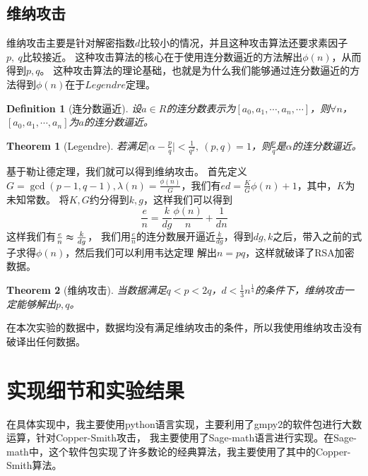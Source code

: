 \documentclass{ctexart}
\newtheorem{theorem}{Theorem}
\newtheorem{definition}{Definition}
\begin{document}
\subsection{维纳攻击}
维纳攻击主要是针对解密指数$d$比较小的情况，并且这种攻击算法还要求素因子$p,\ q$比较接近。
这种攻击算法的核心在于使用连分数逼近的方法解出$\phi(n)$，从而得到$p,q$。
这种攻击算法的理论基础，也就是为什么我们能够通过连分数逼近的方法得到$\phi(n)$在于$Legendre$定理。
\begin{definition}[连分数逼近]
    设$a\in R$的连分数表示为$[a_0,a_1,\cdots,a_n,\cdots]$，则$\forall n$，$[a_0,a_1,\cdots,a_n]$为$a$的连分数逼近。
\end{definition}
\begin{theorem}[Legendre]
    若满足$\vert\alpha-\frac{p}{q}\vert<\frac{1}{q^2},\ (p,q)=1$，则$\frac{p}{q}$是$\alpha$的连分数逼近。
\end{theorem}
基于勒让德定理，我们就可以得到维纳攻击。
首先定义$G=\gcd(p-1,q-1), \lambda(n)=\frac{\phi(n)}{G}$，我们有$ed=\frac{K}{G}\phi(n)+1$，其中，$K$为未知常数。
将$K,G$约分得到$k,g$，这样我们可以得到
$$
\frac{e}{n}=\frac{k}{dg}\frac{\phi(n)}{n}+\frac{1}{dn}
$$
这样我们有$\frac{e}{n}\thickapprox \frac{k}{dg}$，
我们用$\frac{e}{n}$的连分数展开逼近$\frac{k}{dg}$，得到$dg,k$之后，带入之前的式子求得$\phi(n)$，然后我们可以利用韦达定理
解出$n=pq$，这样就破译了RSA加密数据。
\begin{theorem}[维纳攻击]
    当数据满足$q<p<2q$，$d<\frac{1}{3}n^{\frac{1}{4}}$的条件下，维纳攻击一定能够解出$p,q$。
\end{theorem}
在本次实验的数据中，数据均没有满足维纳攻击的条件，所以我使用维纳攻击没有破译出任何数据。
\section{实现细节和实验结果}
在具体实现中，我主要使用python语言实现，主要利用了gmpy2的软件包进行大数运算，针对Copper-Smith攻击，
我主要使用了Sage-math语言进行实现。在Sage-math中，这个软件包实现了许多数论的经典算法，我主要使用了其中的Copper-Smith算法。
\end{document}
